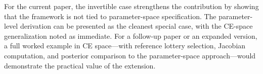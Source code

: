 \documentclass[11pt,a4paper]{article}
\theoremstyle{definition}
\begin{document}
For the current paper, the invertible case strengthens the contribution by
showing that the framework is not tied to parameter-space specification. The
parameter-level derivation can be presented as the cleanest special case, with
the CE-space generalization noted as immediate. For a follow-up paper or an
expanded version, a full worked example in CE space---with reference lottery
selection, Jacobian computation, and posterior comparison to the parameter-space
approach---would demonstrate the practical value of the extension.
\end{document}
